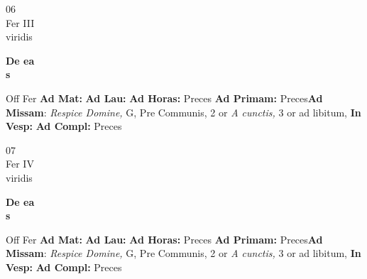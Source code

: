\documentclass[10pt, openany]{book}
\begin{document}
    \begin{center}
        \begin{minipage}{3.5in}
            \vspace{2em}
            \begin{minipage}{0.5in}
                {\Huge 06} \\
                {\normalsize Fer III} \\
                {\normalsize viridis}
            \end{minipage}
            \begin{minipage}{3.0in}
                \textbf{ \large De ea \\
                \textnormal{\normalsize s}} \\ 
            \end{minipage}
            \begin{justify}Off Fer
                \textbf{Ad Mat: }
                \textbf{Ad Lau: }
                \textbf{Ad Horas: }Preces
                \textbf{Ad Primam: }Preces\textbf{Ad Missam}: \textit{Respice Domine,} G, Pre Communis, 2 or \textit{A cunctis,} 3 or ad libitum,  
                \textbf{In Vesp: }
                \textbf{Ad Compl: }Preces
            \end{justify}
        \end{minipage}
    \end{center}

    \begin{center}
        \begin{minipage}{3.5in}
            \vspace{2em}
            \begin{minipage}{0.5in}
                {\Huge 07} \\
                {\normalsize Fer IV} \\
                {\normalsize viridis}
            \end{minipage}
            \begin{minipage}{3.0in}
                \textbf{ \large De ea \\
                \textnormal{\normalsize s}} \\ 
            \end{minipage}
            \begin{justify}Off Fer
                \textbf{Ad Mat: }
                \textbf{Ad Lau: }
                \textbf{Ad Horas: }Preces
                \textbf{Ad Primam: }Preces\textbf{Ad Missam}: \textit{Respice Domine,} G, Pre Communis, 2 or \textit{A cunctis,} 3 or ad libitum,  
                \textbf{In Vesp: }
                \textbf{Ad Compl: }Preces
            \end{justify}
        \end{minipage}
    \end{center}
\end{document}
